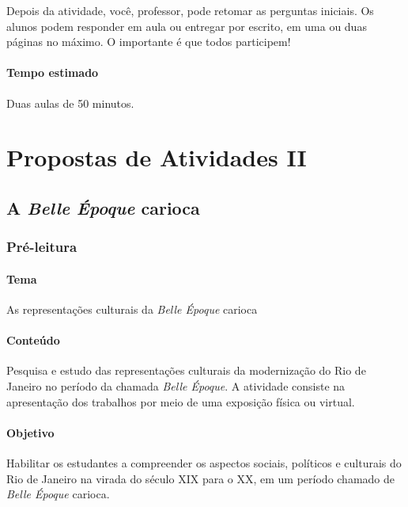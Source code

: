 \documentclass[12pt]{extarticle}
\begin{document}
Depois da atividade, você, professor, pode retomar as perguntas
iniciais. Os alunos podem responder em aula ou entregar por escrito, em
uma ou duas páginas no máximo. O importante é que todos participem!

\paragraph{Tempo estimado} Duas aulas de 50 minutos.



\section{Propostas de Atividades II}

\subsection{A \emph{Belle Époque} carioca}

\subsubsection{Pré-leitura}


\paragraph{Tema} As representações culturais da \emph{Belle Époque} carioca

\paragraph{Conteúdo} Pesquisa e estudo das representações culturais da
modernização do Rio de Janeiro no período da chamada \emph{Belle
Époque}. A atividade consiste na apresentação dos trabalhos por meio de
uma exposição física ou virtual.

\paragraph{Objetivo} Habilitar os estudantes a compreender os aspectos
sociais, políticos e culturais do Rio de Janeiro na virada do século \textsc{XIX}
para o \textsc{XX}, em um período chamado de \emph{Belle Époque} carioca.
\end{document}
